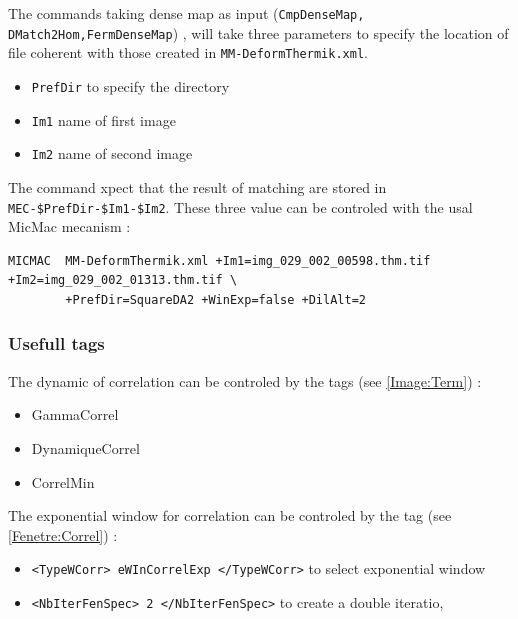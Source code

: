 The commands taking dense map as input ({\tt CmpDenseMap, DMatch2Hom,FermDenseMap}) , will take three parameters to 
specify the location of file coherent with those created in {\tt MM-DeformThermik.xml}.

\begin{itemize}
    \item  {\tt PrefDir}  to specify the directory
    \item  {\tt Im1} name of first image
    \item  {\tt Im2} name of second image
\end{itemize}

The command xpect that the result of matching are stored in 
{\tt MEC-\${PrefDir}-\${Im1}-\${Im2}}.
These three value can be controled with the usal MicMac mecanism :

\begin{verbatim}
MICMAC  MM-DeformThermik.xml +Im1=img_029_002_00598.thm.tif +Im2=img_029_002_01313.thm.tif \
        +PrefDir=SquareDA2 +WinExp=false +DilAlt=2
\end{verbatim}



\subsubsection{Usefull tags}


The dynamic of correlation can be controled by the tags (see \ref{Image:Term}) :

\begin{itemize}
    \item  GammaCorrel
    \item  DynamiqueCorrel
    \item  CorrelMin
\end{itemize}

The exponential window for correlation can be controled by the tag (see \ref{Fenetre:Correl}) :

\begin{itemize}
    \item  {\tt    <TypeWCorr> eWInCorrelExp            </TypeWCorr>} to select exponential window
    \item  {\tt    <NbIterFenSpec>   2           </NbIterFenSpec>}  to create a double iteratio,
\end{itemize}

